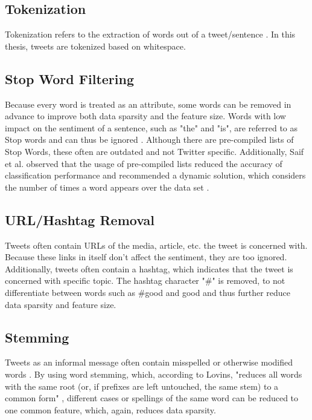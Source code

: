 
\subsection{Tokenization}

Tokenization refers to the extraction of words out of a tweet/sentence \cite{DBLP:journals/csur/GiachanouC16}. In this thesis, tweets are tokenized based on whitespace. 
\subsection{Stop Word Filtering}
Because every word is treated as an attribute, some words can be removed in advance to improve both data sparsity and the feature size. Words with low impact on the sentiment of a sentence, such as "the" and "is", are referred to as Stop words and can thus be ignored \cite{DBLP:journals/csur/GiachanouC16}. Although there are pre-compiled lists of Stop Words, these often are outdated and not Twitter specific. Additionally, Saif et al. observed that the usage of pre-compiled lists reduced the accuracy of classification performance and recommended a dynamic solution, which considers the number of times a word appears over the data set \cite{data_sparsity}. 

\subsection{URL/Hashtag Removal}
Tweets often contain URLs of the media, article, etc. the tweet is concerned with. Because these links in itself don't affect the sentiment, they are too ignored. Additionally, tweets often contain a hashtag, which indicates that the tweet is concerned with specific topic. The hashtag character "\#" is removed, to not differentiate between words such as \#good and good and thus further reduce data sparsity and feature size.
\subsection{Stemming}
Tweets as an informal message often contain misspelled or otherwise modified words \cite{DBLP:journals/csur/GiachanouC16}. By using word stemming, which, according to Lovins, "reduces all words with the same root (or, if prefixes are left
untouched, the same stem) to a common form" \cite[p.~22]{Lovins1968DevelopmentOA}, different cases or spellings of the same word can be reduced to one common feature, which, again, reduces data sparsity.

